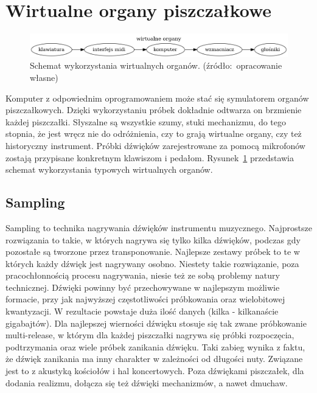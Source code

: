 \documentclass[11pt]{report}
\begin{document}
    \section{Wirtualne organy piszczałkowe}\label{sec:wirtualne-organy-piszczałkowe}

    \begin{figure}[!ht]
        \centering
        \includegraphics[width=\linewidth]{fig/organizacja.png}
        \caption{Schemat wykorzystania wirtualnych organów. (źródło:~opracowanie własne)}
        \label{fig:schemat}
    \end{figure}

    Komputer z odpowiednim oprogramowaniem może stać się symulatorem organów piszczałkowych.
    Dzięki wykorzystaniu próbek dokładnie odtwarza on brzmienie każdej piszczałki.
    Słyszalne są wszystkie szumy, stuki mechanizmu, do tego stopnia, że jest wręcz nie do odróżnienia, czy to grają wirtualne organy, czy też historyczny instrument.
    Próbki dźwięków zarejestrowane za pomocą mikrofonów zostają przypisane konkretnym klawiszom i pedałom.
    Rysunek~\ref{fig:schemat} przedstawia schemat wykorzystania typowych wirtualnych organów.

    \subsection{Sampling}
    Sampling to technika nagrywania dźwięków instrumentu muzycznego.
    Najprostsze rozwiązania to takie, w których nagrywa się tylko kilka dźwięków, podczas gdy pozostałe są tworzone przez transponowanie.
    Najlepsze zestawy próbek to te w których każdy dźwięk jest nagrywany osobno.
    Niestety takie rozwiązanie, poza pracochłonnością procesu nagrywania, niesie też ze sobą problemy natury technicznej.
    Dźwięki powinny być przechowywane w najlepszym możliwie formacie, przy jak najwyższej częstotliwości próbkowania oraz wielobitowej kwantyzacji.
    W rezultacie powstaje duża ilość danych (kilka - kilkanaście gigabajtów).
    Dla najlepszej wierności dźwięku stosuje się tak zwane próbkowanie multi-release,
    w którym dla każdej piszczałki nagrywa się próbki rozpoczęcia, podtrzymania oraz wiele próbek zanikania dźwięku.
    Taki zabieg wynika z faktu, że dźwięk zanikania ma inny charakter w zależności od długości nuty.
    Związane jest to z akustyką kościołów i hal koncertowych.
    Poza dźwiękami piszczałek, dla dodania realizmu, dołącza się też dźwięki mechanizmów, a nawet dmuchaw.
\end{document}
